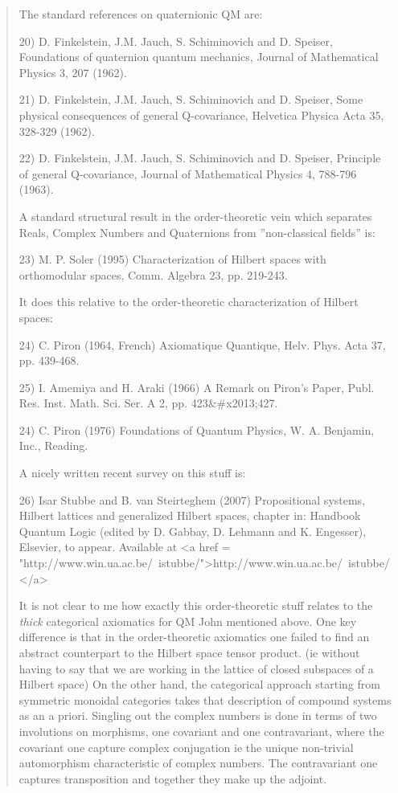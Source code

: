 \begin{quote}
The standard references on quaternionic QM are:

20) D. Finkelstein, J.M. Jauch, S. Schiminovich and D. Speiser, Foundations of 
quaternion quantum mechanics, Journal of Mathematical Physics 3, 207 (1962).

21)
D. Finkelstein, J.M. Jauch, S. Schiminovich and D. Speiser, Some physical consequences of general Q-covariance, Helvetica Physica Acta 35, 328-329 (1962).

22) D. Finkelstein, J.M. Jauch, S. Schiminovich and D. Speiser, Principle of 
general Q-covariance, Journal of Mathematical Physics 4, 788-796 (1963).

A standard structural result in the order-theoretic vein which separates Reals, Complex Numbers and Quaternions from ''non-classical fields'' is:

23) M. P. Soler (1995) Characterization of Hilbert spaces with orthomodular 
spaces, Comm. Algebra 23, pp. 219-243.

It does this relative to the order-theoretic characterization of Hilbert 
spaces:

24) C.  Piron (1964, French) Axiomatique Quantique, Helv. Phys. Acta 37, 
pp. 439-468. 

25) I. Amemiya and H. Araki (1966) A Remark on Piron's Paper, Publ. Res. Inst. Math. Sci. Ser. A 2, pp. 423&#x2013;427. 

24) C. Piron (1976) Foundations of Quantum Physics, W. A. Benjamin, Inc., 
Reading. 

A nicely written recent survey on this stuff is:

26) Isar Stubbe and B. van Steirteghem (2007) Propositional systems,
Hilbert lattices and generalized Hilbert spaces, chapter in: Handbook
Quantum Logic (edited by D. Gabbay, D. Lehmann and K. Engesser),
Elsevier, to appear.  Available at <a href =
"http://www.win.ua.ac.be/~istubbe/">http://www.win.ua.ac.be/~istubbe/</a>

It is not clear to me how exactly this order-theoretic stuff relates
to the \emph{thick} categorical axiomatics for QM John mentioned
above.  One key difference is that in the order-theoretic axiomatics
one failed to find an abstract counterpart to the Hilbert space tensor
product.  (ie without having to say that we are working in the lattice
of closed subspaces of a Hilbert space) On the other hand, the
categorical approach starting from symmetric monoidal categories takes
that description of compound systems as an a priori.  Singling out the
complex numbers is done in terms of two involutions on morphisms, one
covariant and one contravariant, where the covariant one capture
complex conjugation ie the unique non-trivial automorphism
characteristic of complex numbers.  The contravariant one captures
transposition and together they make up the adjoint.

\end{quote}

